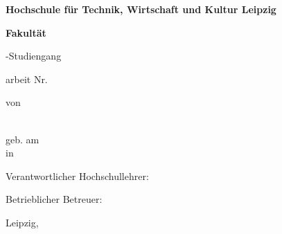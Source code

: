 \begin{titlepage}
{\centering
{\Large \textbf{Hochschule für Technik, Wirtschaft und Kultur Leipzig}\par}
{\large \textbf{Fakultät \fak} \par}
{\large \abschluss-Studiengang \studiengang\par}
\vspace{1.75cm}
{\Large \textbf{\titel}\par}
\vspace{1.25cm}
{\large \abschluss arbeit Nr. \arbeitsnr\par}
\vspace{2.5cm}
{\large  von\par}
\vspace{1.5cm}
{\autor\\[3ex]
geb. am \gebdatum\\[3ex]
in \gebort\\[3ex]
\mnr\par}}
\vfill
{\noindent Verantwortlicher Hochschullehrer: \betreuerI

\vspace{0.25cm}
Betrieblicher Betreuer: \betreuerII

\vspace{1cm}
Leipzig, \zeitraum} %
\end{titlepage}